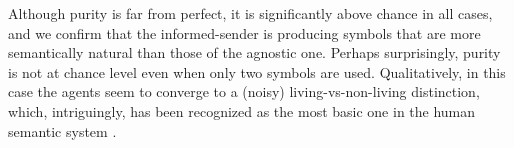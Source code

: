 Although purity is far from perfect, it is significantly above chance
in all cases, and we confirm that the informed-sender is producing
symbols that are more semantically natural than those of the agnostic
one. Perhaps surprisingly, purity is not at chance level even when
only two symbols are used. Qualitatively, in this case the agents seem
to converge to a (noisy) living-vs-non-living distinction, which,
intriguingly, has been recognized as the most basic one in the human
semantic system \citep{Caramazza:Shelton:1998}.










